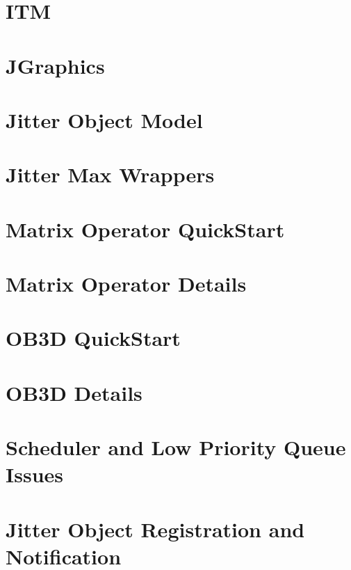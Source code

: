 \documentclass[a4paper]{book}
\begin{document}
\chapter{ITM}
\label{chapter_itm}
\hypertarget{chapter_itm}{}

\chapter{JGraphics}
\label{chapter_jgraphics}
\hypertarget{chapter_jgraphics}{}

\chapter{Jitter Object Model}
\label{chapter_jit_objectmodel}
\hypertarget{chapter_jit_objectmodel}{}

\chapter{Jitter Max Wrappers}
\label{chapter_jit_maxwrappers}
\hypertarget{chapter_jit_maxwrappers}{}

\chapter{Matrix Operator QuickStart}
\label{chapter_jit_mopqs}
\hypertarget{chapter_jit_mopqs}{}

\chapter{Matrix Operator Details}
\label{chapter_jit_mopdetails}
\hypertarget{chapter_jit_mopdetails}{}

\chapter{OB3D QuickStart}
\label{chapter_jit_ob3dqs}
\hypertarget{chapter_jit_ob3dqs}{}

\chapter{OB3D Details}
\label{chapter_jit_ob3ddetails}
\hypertarget{chapter_jit_ob3ddetails}{}

\chapter{Scheduler and Low Priority Queue Issues}
\label{chapter_jit_sched}
\hypertarget{chapter_jit_sched}{}

\chapter{Jitter Object Registration and Notification}
\label{chapter_jit_notification}
\hypertarget{chapter_jit_notification}{}

\end{document}
